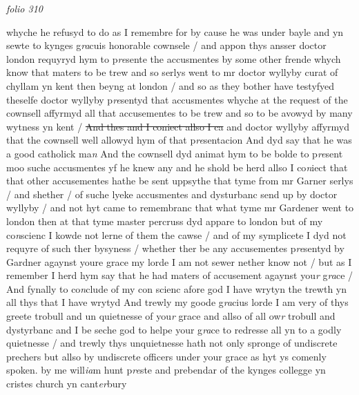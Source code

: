 \documentclass[12pt, a4paper]{book}
\begin{document}
\dotfill
					

\textit{folio 310}


whyche he refusyd to do as I remembre for by cause he was under bayle and yn sewte to kynges g\textit{ra}cuis honorable cownsele / and appon thys ansser doctor london requyryd hym to p\textit{re}sente the accusmentes by some other frende whych know that maters to be trew and so serlys went to mr doctor wyllyby curat of chyllam yn kent then beyng at london / and so as they bother have testyfyed theselfe doctor wyllyby p\textit{re}sentyd that accusmentes whyche at the request of the cownsell affyrmyd all that accusementes  to be trew and so to be avowyd by many wytness yn kent / \sout{And thes and I coniect allso I ca}
               and 
			doctor wyllyby affyrmyd that the cownsell well allowyd hym of that p\textit{re}sentacion  And dyd say that he was a good catholick ma\textit{n} And the cownsell dyd animat hym to be bolde to p\textit{re}sent moo suche accusmentes yf he knew any and he shold be herd allso I co\textit{n}iect that
			  that other accusementes hathe be sent uppsythe that tyme from mr Garner serlys / and shether / of suche lyeke accusmentes and dysturbanc send up by doctor wyllyby / and not hyt came to remembranc that what tyme mr Gardener went to london then at that tyme master percruss dyd appare to london but of my co\textit{n}scienc I kowde not lerne of them the cawse / and of my symplicete I dyd not requyre of such ther bysyness / whether ther be any accusementes p\textit{re}sentyd by Gardner agaynst youre grace my lorde I am not  sewer nether know not / but as I remember I herd hym say that he had maters of accusement agaynst you\textit{r} g\textit{ra}ce / And fynally to co\textit{n}clude of my con scienc afore god I have wrytyn the trewth yn all thys that I have wrytyd And trewly my goode g\textit{ra}cius lorde I am very of thys greete trobull and un quietnesse of you\textit{r} grace and allso of all ow\textit{r} trobull and dystyrbanc and I be seche god to helpe your g\textit{ra}ce to redresse all yn to a godly quietnesse / and trewly thys unquietnesse hath not only spronge of undiscrete prechers but allso by undiscrete officers under your grace as hyt ys comenly spoken.  by me will\textit{ia}m hunt p\textit{re}ste and prebendar of the kynges collegge yn  cristes church yn cant\textit{er}bury
\end{document}
